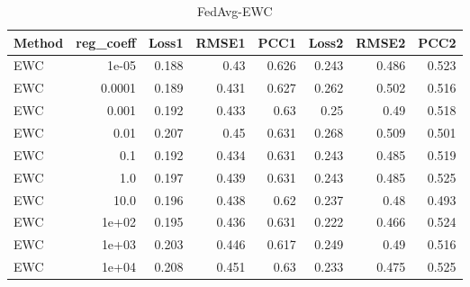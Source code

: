 \begin{table}
\caption{FedAvg-EWC}
\begin{tabular}{lrrrrrrr}
\toprule
Method & reg_coeff & Loss1 & RMSE1 & PCC1 & Loss2 & RMSE2 & PCC2 \\
\midrule
EWC & 1e-05 & 0.188 & 0.43 & 0.626 & 0.243 & 0.486 & 0.523 \\
EWC & 0.0001 & 0.189 & 0.431 & 0.627 & 0.262 & 0.502 & 0.516 \\
EWC & 0.001 & 0.192 & 0.433 & 0.63 & 0.25 & 0.49 & 0.518 \\
EWC & 0.01 & 0.207 & 0.45 & 0.631 & 0.268 & 0.509 & 0.501 \\
EWC & 0.1 & 0.192 & 0.434 & 0.631 & 0.243 & 0.485 & 0.519 \\
EWC & 1.0 & 0.197 & 0.439 & 0.631 & 0.243 & 0.485 & 0.525 \\
EWC & 10.0 & 0.196 & 0.438 & 0.62 & 0.237 & 0.48 & 0.493 \\
EWC & 1e+02 & 0.195 & 0.436 & 0.631 & 0.222 & 0.466 & 0.524 \\
EWC & 1e+03 & 0.203 & 0.446 & 0.617 & 0.249 & 0.49 & 0.516 \\
EWC & 1e+04 & 0.208 & 0.451 & 0.63 & 0.233 & 0.475 & 0.525 \\
\bottomrule
\end{tabular}
\end{table}
